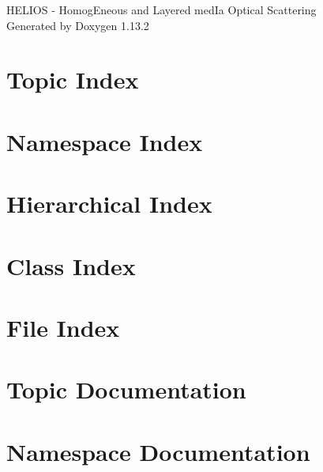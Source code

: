 \documentclass[twoside]{book}
\newcommand{\+}{\discretionary{\mbox{\scriptsize$\hookleftarrow$}}{}{}}
\newcommand{\clearemptydoublepage}{%
    \newpage{\pagestyle{empty}\cleardoublepage}%
  }
\begin{document}
  \raggedbottom
    \hypersetup{pageanchor=false,
                bookmarksnumbered=true,
                pdfencoding=unicode
               }
  \begin{titlepage}
  \vspace*{7cm}
  \begin{center}%
  {\Large HELIOS -\/ Homog\+Eneous and Layered med\+Ia Optical Scattering}\\
  \vspace*{1cm}
  {\large Generated by Doxygen 1.13.2}\\
  \end{center}
  \end{titlepage}
  \clearemptydoublepage
  \tableofcontents
  \clearemptydoublepage
  \hypersetup{pageanchor=true}


\chapter{Topic Index}

\chapter{Namespace Index}

\chapter{Hierarchical Index}

\chapter{Class Index}

\chapter{File Index}

\chapter{Topic Documentation}

\chapter{Namespace Documentation}


\end{document}
